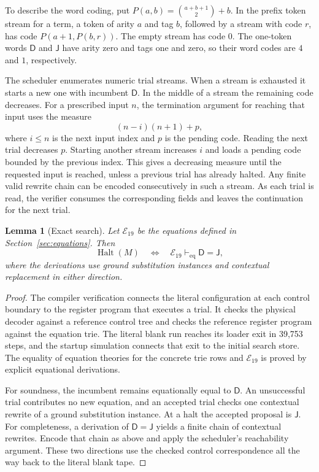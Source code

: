 \documentclass[11pt,letterpaper]{article}
\newtheorem{lemma}[theorem]{Lemma}
\newcommand{\Halt}{\operatorname{Halt}}
\newcommand{\D}{\mathsf D}
\newcommand{\J}{\mathsf J}
\begin{document}
To describe the word coding, put
$P(a,b)=\binom{a+b+1}{2}+b$. In the prefix token stream for a term,
a token of arity $a$ and tag $b$, followed by a stream with code $r$,
has code $P(a+1,P(b,r))$. The empty stream has code $0$.
The one-token words $\D$ and $\J$ have arity zero and tags one and
zero, so their word codes are $4$ and $1$, respectively.

The scheduler enumerates numeric trial streams. When a stream is
exhausted it starts a new one with incumbent $\D$. In the middle of a
stream the remaining code decreases. For a prescribed input $n$, the
termination argument for reaching that input uses the measure
\[
   (n-i)(n+1)+p,
\]
where $i\le n$ is the next input index and $p$ is the pending code.
Reading the next trial decreases $p$. Starting another stream
increases $i$ and loads a pending code bounded by the previous index.
This gives a decreasing measure until the requested input is reached,
unless a previous trial has already halted. Any finite valid rewrite
chain can be encoded consecutively in such a stream. As each trial is
read, the verifier consumes the corresponding fields and leaves the
continuation for the next trial.

\begin{lemma}[Exact search]\label{lem:search}
Let $\mathcal E_{19}$ be the equations defined in
Section~\ref{sec:equations}. Then
\[
  \Halt(M)\quad\Longleftrightarrow\quad
  \mathcal E_{19}\vdash_{\mathrm{eq}}\D=\J,
\]
where the derivations use ground substitution instances and contextual
replacement in either direction.
\end{lemma}

\begin{proof}
The compiler verification connects the literal configuration at each
control boundary to the register program that executes a trial. It
checks the physical decoder against a reference control tree and
checks the reference register program against the equation trie. The
literal blank run reaches its loader exit in 39,753 steps, and the
startup simulation connects that exit to the initial search store.
The equality of equation theories for the concrete trie rows and
$\mathcal E_{19}$ is proved by explicit equational derivations.

For soundness, the incumbent remains equationally equal to $\D$.
An unsuccessful trial contributes no new equation, and an accepted
trial checks one contextual rewrite of a ground substitution instance.
At a halt the accepted proposal is $\J$. For completeness, a derivation
of $\D=\J$ yields a finite chain of contextual rewrites. Encode that
chain as above and apply the scheduler's reachability argument. These
two directions use the checked control correspondence all the way
back to the literal blank tape.
\end{proof}
\end{document}
